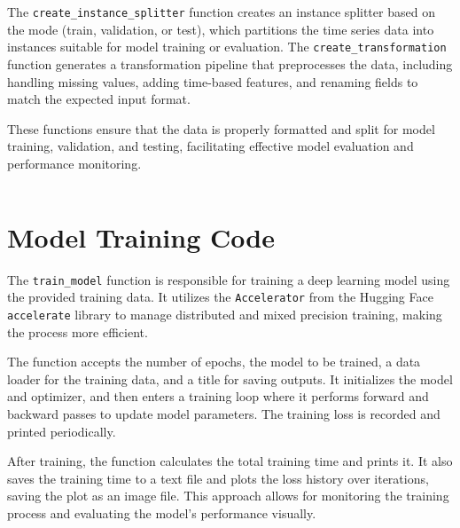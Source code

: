 The \texttt{create\_instance\_splitter} function creates an instance splitter based on the mode (train, validation, or test), which partitions the time series data into instances suitable for model training or evaluation. The \texttt{create\_transformation} function generates a transformation pipeline that preprocesses the data, including handling missing values, adding time-based features, and renaming fields to match the expected input format.

These functions ensure that the data is properly formatted and split for model training, validation, and testing, facilitating effective model evaluation and performance monitoring.

\begin{lstlisting}[language=Python, caption={Code for creating data loaders for efficient training and evaluation}, breaklines=true, label=code4]

\end{lstlisting}

\section{Model Training Code}

The \texttt{train\_model} function is responsible for training a deep learning model using the provided training data. It utilizes the \texttt{Accelerator} from the Hugging Face \texttt{accelerate} library to manage distributed and mixed precision training, making the process more efficient.

The function accepts the number of epochs, the model to be trained, a data loader for the training data, and a title for saving outputs. It initializes the model and optimizer, and then enters a training loop where it performs forward and backward passes to update model parameters. The training loss is recorded and printed periodically.

After training, the function calculates the total training time and prints it. It also saves the training time to a text file and plots the loss history over iterations, saving the plot as an image file. This approach allows for monitoring the training process and evaluating the model's performance visually.

